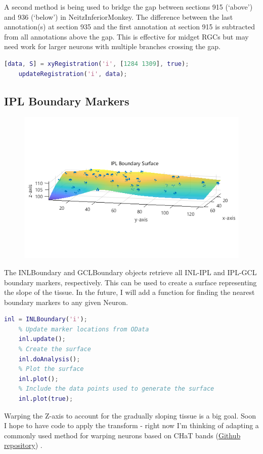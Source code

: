 \documentclass[12pt]{exam}
\begin{document}
	A second method is being used to bridge the gap between sections 915 (`above') and 936 (`below') in NeitzInferiorMonkey. The difference between the last annotation(s) at section 935 and the first annotation at section 915 is subtracted from all annotations above the gap. This is effective for midget RGCs but may need work for larger neurons with multiple branches crossing the gap.
	\begin{lstlisting}[language=matlab]
	[data, S] = xyRegistration('i', [1284 1309], true);
	updateRegistration('i', data);\end{lstlisting}
	\subsection{IPL Boundary Markers}
	\begin{figure}
		\includegraphics[width=\linewidth]{iplboundary}
		\label{iplboundary}
	\end{figure}
	The INLBoundary and GCLBoundary objects retrieve all INL-IPL and IPL-GCL boundary markers, respectively. This can be used to create a surface representing the slope of the tissue. In the future, I will add a function for finding the nearest boundary markers to any given Neuron.
	\begin{lstlisting}[language=matlab]
	inl = INLBoundary('i');
	% Update marker locations from OData
	inl.update();
	% Create the surface
	inl.doAnalysis();
	% Plot the surface
	inl.plot();
	% Include the data points used to generate the surface
	inl.plot(true);\end{lstlisting}
	Warping the Z-axis to account for the gradually sloping tissue is a big goal. Soon I hope to have code to apply the transform - right now I'm thinking of adapting a commonly used method for warping neurons based on CHaT bands (\href{https://github.com/uygarsumbul/rgc}{Github repository}) \cite{Sumbul2014}.
\end{document}
